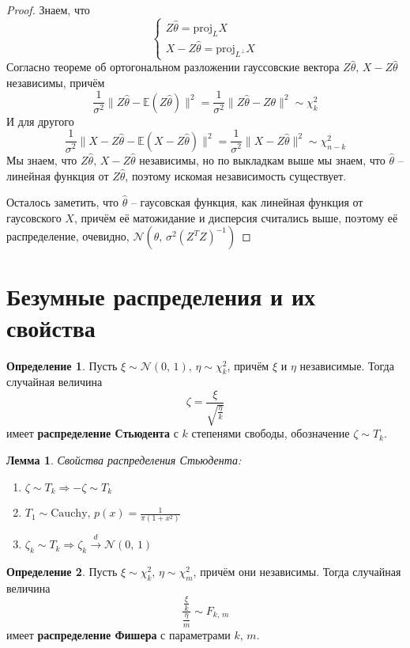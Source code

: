 \documentclass[a4paper,12pt]{article}
\theoremstyle{plain}
\newtheorem{lemma}{Лемма}[section]
\theoremstyle{definition}
\newtheorem{definition}{Определение}[section]
\theoremstyle{remark}
\begin{document}
\begin{proof}
  Знаем, что
  \[
    \begin{cases}
      Z\hat{\theta} = \text{proj}_LX\\
      X - Z\hat{\theta} = \text{proj}_{L^\bot}X
    \end{cases}
  \]
  Согласно теореме об ортогональном разложении гауссовские вектора $Z\hat{\theta},\, X - Z\hat{\theta}$ независимы, причём
  \[
    \frac{1}{\sigma^2}\|Z\hat{\theta} - \mathbb{E}(Z\hat{\theta})\|^2 = \frac{1}{\sigma^2}\|Z\hat{\theta} - Z\theta\|^2 \sim \chi^2_k
  \]
  И для другого
  \[
    \frac{1}{\sigma^2}\|X - Z\hat{\theta} - \mathbb{E}(X - Z\hat{\theta})\|^2 = \frac{1}{\sigma^2}\|X - Z\hat{\theta}\|^2 \sim \chi^2_{n - k}
  \]
  Мы знаем, что $Z\hat{\theta},\, X - Z\hat{\theta}$ независимы, но по выкладкам выше мы знаем, что $\hat{\theta}$ -- линейная функция от $Z\hat{\theta}$, поэтому искомая независимость существует.

  Осталось заметить, что $\hat{\theta}$ -- гаусовская функция, как линейная функция от гаусовского $X$, причём её матожидание и дисперсия считались выше, поэтому её распределение, очевидно, $\mathcal{N}(\theta,\, \sigma^2(Z^TZ)^{-1})$
\end{proof}

\section{Безумные распределения и их свойства}
\begin{definition}
  Пусть $\xi \sim \mathcal{N}(0,\,1),\, \eta \sim \chi^2_k$, причём $\xi$ и $\eta$ независимые. Тогда случайная величина
  \[
    \zeta = \frac{\xi}{\sqrt{\frac{\eta}{k}}}
  \]
  имеет \textbf{распределение Стьюдента} с $k$ степенями свободы, обозначение $\zeta \sim T_k$.
\end{definition}

\begin{lemma}
  Свойства распределения Стьюдента:
  \begin{enumerate}
    \item $\zeta \sim T_k \Rightarrow -\zeta \sim T_k$
    \item $T_1 \sim \text{Cauchy},\, p(x) = \frac{1}{\pi(1 + x^2)}$
    \item $\zeta_k \sim T_k \Rightarrow \zeta_k \overset{d}{\to} \mathcal{N}(0,\,1)$
  \end{enumerate}
\end{lemma}

\begin{definition}
  Пусть $\xi \sim \chi^2_k,\, \eta \sim \chi^2_m$, причём они независимы. Тогда случайная величина
  \[
    \frac{\frac{\xi}{k}}{\frac{\eta}{m}} \sim F_{k,\,m}
  \]
  имеет \textbf{распределение Фишера} с параметрами $k,\,m$.
\end{definition}
\end{document}
